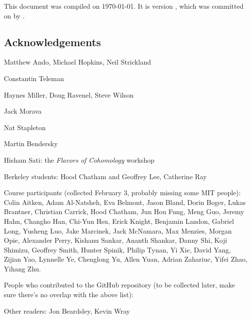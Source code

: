 


\newpage

This document was compiled on \today. It is version {\gitAbbrevHash}, which was committed on {\gitAuthorDate} by {\gitAuthorName}.

\subsection*{Acknowledgements}

Matthew Ando, Michael Hopkins, Neil Strickland

Constantin Teleman

Haynes Miller, Doug Ravenel, Steve Wilson

Jack Morava

Nat Stapleton

Martin Bendersky



Hisham Sati: the \textit{Flavors of Cohomology} workshop

Berkeley students: Hood Chatham and Geoffrey Lee, Catherine Ray

Course participants (collected February 3, probably missing some MIT people): Colin Aitken, Adam Al-Natsheh, Eva Belmont, Jason Bland, Dorin Boger, Lukas Brantner, Christian Carrick, Hood Chatham, Jun Hou Fung, Meng Guo, Jeremy Hahn, Changho Han, Chi-Yun Hsu, Erick Knight, Benjamin Landon, Gabriel Long, Yusheng Luo, Jake Marcinek, Jack McNamara, Max Menzies, Morgan Opie, Alexander Perry, Kishanu Sankar, Ananth Shankar, Danny Shi, Koji Shimizu, Geoffrey Smith, Hunter Spinik, Philip Tynan, Yi Xie, David Yang, Zijian Yao, Lynnelle Ye, Chenglong Yu, Allen Yuan, Adrian Zahariuc, Yifei Zhao, Yihang Zhu.

People who contributed to the GitHub repository (to be collected later, make sure there's no overlap with the above list): 

Other readers: Jon Beardsley, Kevin Wray
